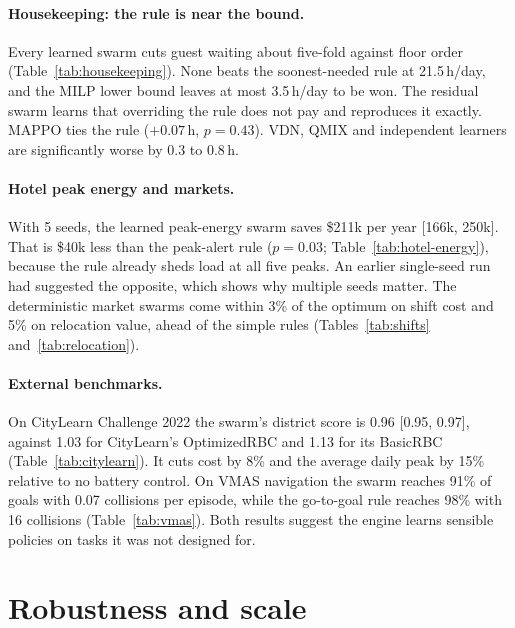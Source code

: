 \documentclass[11pt]{article}
\begin{document}
\paragraph{Housekeeping: the rule is near the bound.} Every learned swarm cuts guest waiting about five-fold against floor order (Table~\ref{tab:housekeeping}). None beats the soonest-needed rule at 21.5\,h/day, and the MILP lower bound leaves at most 3.5\,h/day to be won. The residual swarm learns that overriding the rule does not pay and reproduces it exactly. MAPPO ties the rule ($+0.07$\,h, $p=0.43$). VDN, QMIX and independent learners are significantly worse by 0.3 to 0.8\,h.





\paragraph{Hotel peak energy and markets.} With 5 seeds, the learned peak-energy swarm saves \$211k per year [166k, 250k]. That is \$40k less than the peak-alert rule ($p=0.03$; Table~\ref{tab:hotel-energy}), because the rule already sheds load at all five peaks. An earlier single-seed run had suggested the opposite, which shows why multiple seeds matter. The deterministic market swarms come within 3\% of the optimum on shift cost and 5\% on relocation value, ahead of the simple rules (Tables~\ref{tab:shifts} and~\ref{tab:relocation}).




\paragraph{External benchmarks.} On CityLearn Challenge 2022 the swarm's district score is 0.96 [0.95, 0.97], against 1.03 for CityLearn's OptimizedRBC and 1.13 for its BasicRBC (Table~\ref{tab:citylearn}). It cuts cost by 8\% and the average daily peak by 15\% relative to no battery control. On VMAS navigation the swarm reaches 91\% of goals with 0.07 collisions per episode, while the go-to-goal rule reaches 98\% with 16 collisions (Table~\ref{tab:vmas}). Both results suggest the engine learns sensible policies on tasks it was not designed for.

\section{Robustness and scale}\label{sec:robust}
\end{document}
